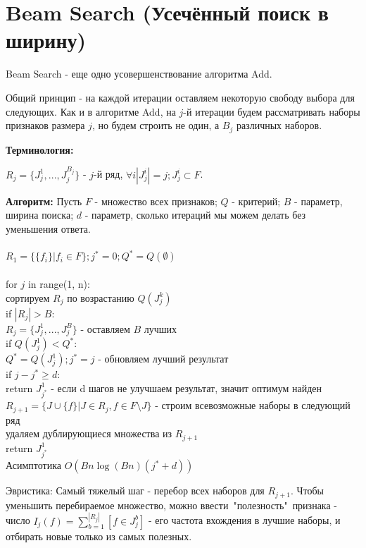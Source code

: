 \section{Beam Search (Усечённый поиск в ширину)}
Beam Search - еще одно усовершенствование алгоритма Add.

Общий принцип - на каждой итерации оставляем некоторую свободу выбора для следующих.
Как и в алгоритме Add, на $j$-й итерации будем рассматривать наборы признаков размера $j$, но будем строить не один, а $B_j$ различных наборов.

\textbf{Терминология:}

$R_j = \{ J_j^{1}, ..., J_j^{B_j}\}$ - $j$-й ряд, $\forall i |J_j^{i}| = j; J_j^{i} \subset F$.

\textbf{Алгоритм:} Пусть $F$ - множество всех признаков; $Q$ - критерий; $B$ - параметр, ширина поиска; $d$ - параметр, сколько итераций мы можем делать без уменьшения ответа.
\\\\
$R_1 = \{ \{f_i\} | f_i \in F\}; j^* = 0; Q^* = Q(\emptyset)$
\\\\
for $j$ in range(1, n):\\
\indent    сортируем $R_j$ по возрастанию $Q(J_j^{k})$\\
\indent    if $|R_j|>B$:\\
\indent    \indent    $R_j = \{J_j^{1}, ..., J_j^{B}\}$ - оставляем $B$ лучших\\
\indent    if $Q(J_j^{1})<Q^*$:\\
\indent    \indent    $Q^* = Q(J_j^{1}); j^* = j$ - обновляем лучший результат\\
\indent    if $j-j^* \geq d$:\\
\indent    \indent    return $J_{j^*}^{1}$ - если d шагов не улучшаем результат, значит оптимум найден\\
\indent    $R_{j+1} = \{J \cup \{f\} | J \in R_j, f \in F \setminus J\}$ - строим всевозможные наборы в следующий ряд\\
\indent    удаляем дублирующиеся множества из $R_{j+1}$\\
return $J_{j^*}^{1}$\\

Асимптотика $O(B n\log(B n) (j^*+d) )$

Эвристика: Самый тяжелый шаг - перебор всех наборов для $R_{j+1}$. Чтобы уменьшить перебираемое множество, можно ввести\ "полезность"\ признака - число $I_j(f) = \sum_{b=1}^{|R_j|} [f \in J_{j}^{b}]$ - 
его частота вхождения в лучшие наборы, и отбирать новые только из самых полезных.

